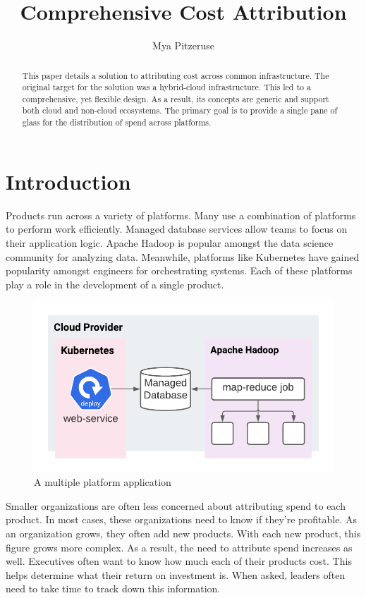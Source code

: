 \documentclass[10pt, a4paper, twocolumn]{article}
\title{Comprehensive Cost Attribution}
\author{Mya Pitzeruse}
\begin{document}
\maketitle

\begin{abstract}
  This paper details a solution to attributing cost across common infrastructure.
  The original target for the solution was a hybrid-cloud infrastructure.
  This led to a comprehensive, yet flexible design.
  As a result, its concepts are generic and support both cloud and non-cloud ecosystems.
  The primary goal is to provide a single pane of glass for the distribution of spend across platforms.
\end{abstract}


\section*{Introduction}
  Products run across a variety of platforms.
  Many use a combination of platforms to perform work efficiently.
  Managed database services allow teams to focus on their application logic.
  Apache Hadoop is popular amongst the data science community for analyzing data.
  Meanwhile, platforms like Kubernetes have gained popularity amongst engineers for orchestrating systems.
  Each of these platforms play a role in the development of a single product.

  \begin{figure}[H]
    \centering
    \includegraphics[width=\linewidth]{./cost-attribution-application.png}
    \caption{A multiple platform application}
    \label{figure:1}
  \end{figure}

  Smaller organizations are often less concerned about attributing spend to each product.
  In most cases, these organizations need to know if they're profitable.
  As an organization grows, they often add new products.
  With each new product, this figure grows more complex.
  As a result, the need to attribute spend increases as well.
  Executives often want to know how much each of their products cost.
  This helps determine what their return on investment is.
  When asked, leaders often need to take time to track down this information.
\end{document}
